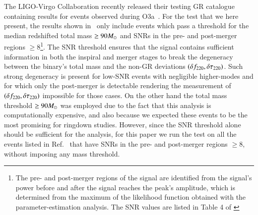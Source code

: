 
The LIGO-Virgo Collaboration recently released their testing GR
catalogue containing results for events observed
during O3a~\cite{Abbott:2020jks}. For the test that we here present, the results shown in~\cite{Abbott:2020jks} only include events which pass a threshold for the median redshifted total mass $\geq 90 M_{\odot}$ and SNRs in the pre- and
post-merger regions $\geq 8$\footnote{The pre- and post-merger regions of the signal are identified from the signal's power before and after the signal reaches the peak's amplitude, which is determined from the maximum of the likelihood function obtained with the parameter-estimation analysis. The SNR values are listed in Table 4 of \cite{Abbott:2020jks}}. 
%
The SNR threshold ensures that the signal contains sufficient information in both the inspiral and merger stages to break the degeneracy between the binary's total mass and the non-GR deviations $(\delta f_{\text{220}}, \delta \tau_{\text{220}})$. Such strong degeneracy is present for low-SNR events with negligible higher-modes and for which only the post-merger is detectable rendering the measurement of $(\delta f_{\text{220}}, \delta \tau_{\text{220}})$ impossible for those cases.
On the other hand the total mass threshold $\geq 90 M_{\odot}$ was employed due to the fact that this analysis is computationally expensive, and also because we expected these events to be the most promising for ringdown studies. However, since the SNR threshold alone should be sufficient for the analysis, for this paper we run the test on all the events listed in Ref.~\cite{Abbott:2020jks} that have SNRs in the pre- and post-merger regions $\geq 8$, without imposing any mass threshold.

